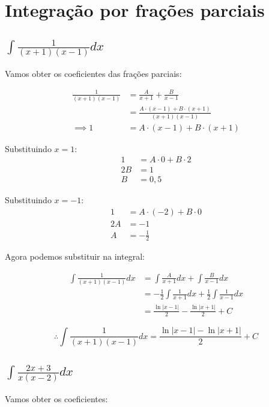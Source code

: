 \documentclass[12pt]{article}
\theoremstyle{definition}
\begin{document}
\section{Integração por frações parciais}
\subsection{\(\int{\frac{1}{(x+1)(x-1)}dx}\)}
Vamos obter os coeficientes das frações parciais:

\begin{align*}
	\frac{1}{(x+1)(x-1)}
	           & = \frac{A}{x+1} + \frac{B}{x-1}                \\
	           & = \frac{A\cdot(x-1) + B\cdot(x+1)}{(x+1)(x-1)} \\
	\implies 1 & = A\cdot(x-1) + B\cdot(x+1)                    
\end{align*}

Substituindo \( x =1\):
\begin{align*}
	1  & = A\cdot 0 + B \cdot 2 \\
	2B & = 1                    \\
	B  & = 0,5                  
\end{align*}

Substituindo \( x = -1\):
\begin{align*}
	1  & = A\cdot (-2) + B \cdot 0 \\
	2A & = -1                      \\
	A  & = -\frac{1}{2}            
\end{align*}

Agora podemos substituir na integral:

\begin{align*}
	\int{\frac{1}{(x+1)(x-1)}dx}
	  & = \int{\frac{A}{x+1}dx} + \int{\frac{B}{x-1}dx}                         \\
	  & = - \frac{1}{2}\int{\frac{1}{x+1}dx} + \frac{1}{2}\int{\frac{1}{x-1}dx} \\
	  & = \frac{\ln{|x-1|}}{2} - \frac{\ln{|x+1|}}{2} + C                       
\end{align*}

\[
	\boxed{
		\therefore \int{\frac{1}{(x+1)(x-1)}dx} = \frac{\ln{|x-1|}-\ln{|x+1|}}{2} + C
	}
\]

\subsection{\(\int{\frac{2x+3}{x(x-2)}dx}\)}
Vamos obter os coeficientes:
\end{document}

